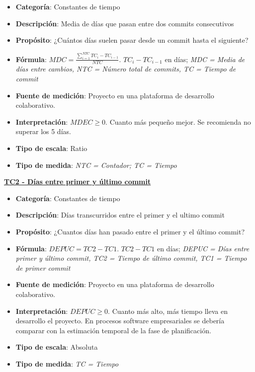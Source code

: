\begin{itemize}
	\tightlist
	\item \textbf{Categoría}: Constantes de tiempo
	\item \textbf{Descripción}: Media de días que pasan entre dos commits consecutivos
	\item \textbf{Propósito}: ¿Cuántos días suelen pasar desde un commit hasta el siguiente?
	\item \textbf{Fórmula}: $MDC = \frac{\sum_{i=1}^{NTC} TC_i - TC_{i-1}}{NTC}$. $TC_i - TC_{i-1}$ en días; \textit{MDC = Media de días entre cambios, NTC = Número total de commits, TC = Tiempo de commit}
	\item \textbf{Fuente de medición}: Proyecto en una plataforma de desarrollo colaborativo.
	\item \textbf{Interpretación}: $MDEC \geq 0$. Cuanto más pequeño mejor. Se recomienda no superar los 5 días.
	\item \textbf{Tipo de escala}: Ratio
	\item \textbf{Tipo de medida}: \textit{NTC = Contador; TC = Tiempo}
\end{itemize}
\textbf{\underline{TC2 - Días entre primer y último commit}}
\begin{itemize}
	\tightlist
	\item \textbf{Categoría}: Constantes de tiempo
	\item \textbf{Descripción}: Días transcurridos entre el primer y el ultimo commit 
	\item \textbf{Propósito}: ¿Cuantos días han pasado entre el primer y el último commit?
	\item \textbf{Fórmula}: $DEPUC = TC2- TC1$. $TC2- TC1$ en días;  \textit{DEPUC = Días entre primer y último commit, TC2 = Tiempo de último commit, TC1 = Tiempo de primer commit}
	\item \textbf{Fuente de medición}: Proyecto en una plataforma de desarrollo colaborativo.
	\item \textbf{Interpretación}: $DEPUC \geq 0$. Cuanto más alto, más tiempo lleva en desarrollo el proyecto. En procesos software empresariales se debería comparar con la estimación temporal de la fase de planificación. 
	\item \textbf{Tipo de escala}: Absoluta
	\item \textbf{Tipo de medida}: \textit{TC = Tiempo}
\end{itemize}
